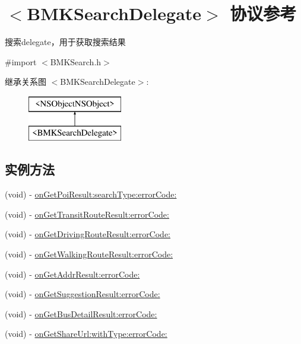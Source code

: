 \hypertarget{protocol_b_m_k_search_delegate-p}{\section{$<$B\-M\-K\-Search\-Delegate$>$ 协议参考}
\label{protocol_b_m_k_search_delegate-p}
}


搜索delegate，用于获取搜索结果  




{\ttfamily \#import $<$B\-M\-K\-Search.\-h$>$}

继承关系图 $<$B\-M\-K\-Search\-Delegate$>$\-:\begin{figure}[H]
\begin{center}
\leavevmode
\includegraphics[height=2.000000cm]{protocol_b_m_k_search_delegate-p}
\end{center}
\end{figure}
\subsection*{实例方法}
\begin{DoxyCompactItemize}
\item 
(void) -\/ \hyperlink{protocol_b_m_k_search_delegate-p_aaebc1737d2df985b3d7878fd9ea53122}{on\-Get\-Poi\-Result\-:search\-Type\-:error\-Code\-:}
\item 
(void) -\/ \hyperlink{protocol_b_m_k_search_delegate-p_a300f82b22ee2295fb1eda590ce468f6e}{on\-Get\-Transit\-Route\-Result\-:error\-Code\-:}
\item 
(void) -\/ \hyperlink{protocol_b_m_k_search_delegate-p_ae37ff980770f8d8b1129e41cc05c76ae}{on\-Get\-Driving\-Route\-Result\-:error\-Code\-:}
\item 
(void) -\/ \hyperlink{protocol_b_m_k_search_delegate-p_a4fcbf962b5af9d50c194a69da26261c1}{on\-Get\-Walking\-Route\-Result\-:error\-Code\-:}
\item 
(void) -\/ \hyperlink{protocol_b_m_k_search_delegate-p_a7eebe5b2da7524f72e9f56413647d2fc}{on\-Get\-Addr\-Result\-:error\-Code\-:}
\item 
(void) -\/ \hyperlink{protocol_b_m_k_search_delegate-p_a029cc846020073395c4c437798ccfa05}{on\-Get\-Suggestion\-Result\-:error\-Code\-:}
\item 
(void) -\/ \hyperlink{protocol_b_m_k_search_delegate-p_aa43e8862315533032603901acaaf8dca}{on\-Get\-Bus\-Detail\-Result\-:error\-Code\-:}
\item 
(void) -\/ \hyperlink{protocol_b_m_k_search_delegate-p_a6650cbc44855ffe0f632b4fa44eaf6d5}{on\-Get\-Share\-Url\-:with\-Type\-:error\-Code\-:}
\end{DoxyCompactItemize}



